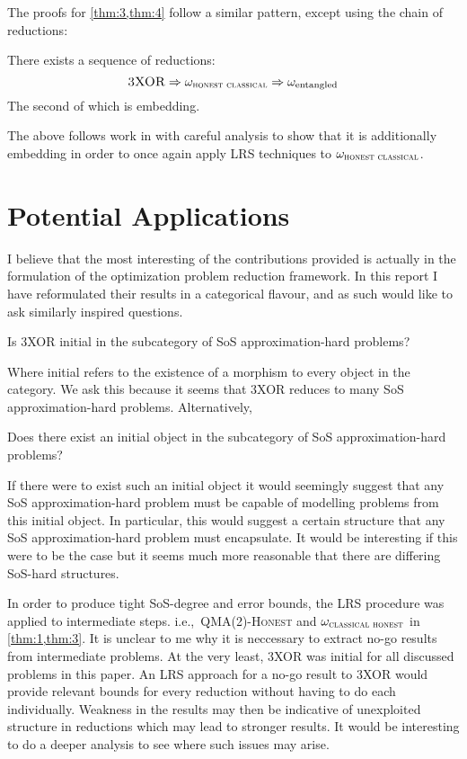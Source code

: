 \documentclass[runningheads,a4paper,english]{llncs}[2022/01/12]
\newcommand{\ie}{i.e.,\ }
\begin{document}
The proofs for \cref{thm:3,thm:4} follow a similar pattern, except using the chain of reductions:
\begin{lemma}\label{lemma:3}
  There exists a sequence of reductions:
  \[\textsc{3XOR} \Rightarrow \omega_{\textsc{honest classical}} \Rightarrow \omega_{\text{entangled}}\]
  The second of which is embedding.
\end{lemma}
The above follows work in \cite{ito2008oracularizationtwoproveroneroundinteractive} with careful analysis to show that it is additionally embedding in order to once again apply LRS techniques to $\omega_{\textsc{honest classical}}$.

\section{Potential Applications}
I believe that the most interesting of the contributions provided is actually in the formulation of the optimization problem reduction framework.
In this report I have reformulated their results in a categorical flavour, and as such would like to ask similarly inspired questions.

\begin{conjecture}
Is \textsc{3XOR} initial in the subcategory of SoS approximation-hard problems?
\end{conjecture}
Where initial refers to the existence of a morphism to every object in the category.
We ask this because it seems that \textsc{3XOR} reduces to many SoS approximation-hard problems.
Alternatively,
\begin{conjecture}
Does there exist an initial object in the subcategory of SoS approximation-hard problems?
\end{conjecture}
If there were to exist such an initial object it would seemingly suggest that any SoS approximation-hard problem must be capable of modelling problems from this initial object.
In particular, this would suggest a certain structure that any SoS approximation-hard problem must encapsulate.
It would be interesting if this were to be the case but it seems much more reasonable that there are differing SoS-hard structures.

In order to produce tight SoS-degree and error bounds, the LRS procedure was applied to intermediate steps.
\ie \textsc{QMA(2)-Honest} and $\omega_{\textsc{classical honest}}$ in \cref{thm:1,thm:3}.
It is unclear to me why it is neccessary to extract no-go results from intermediate problems.
At the very least, \textsc{3XOR} was initial for all discussed problems in this paper.
An LRS approach for a no-go result to \textsc{3XOR} would provide relevant bounds for every reduction without having to do each individually.
Weakness in the results may then be indicative of unexploited structure in reductions which may lead to stronger results.
It would be interesting to do a deeper analysis to see where such issues may arise.
\end{document}
